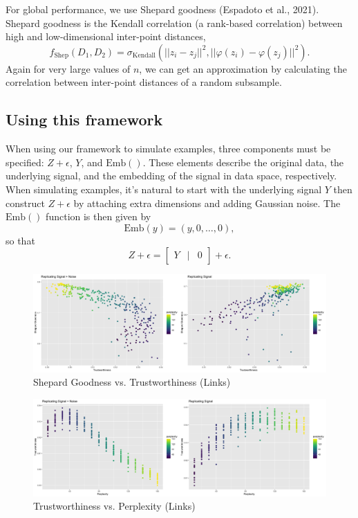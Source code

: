 \documentclass[webpdf,modern,large,namedate]{oup-authoring-template}
\theoremstyle{thmstyleone}%
\theoremstyle{thmstyletwo}%
\theoremstyle{thmstylethree}%
\begin{document}
For global performance, we use Shepard goodness (Espadoto et al., 2021). Shepard goodness is the Kendall correlation (a rank-based correlation) between high and low-dimensional inter-point distances, $$f_\textrm{Shep}(D_1, D_2) = \sigma_\textrm{Kendall}(||z_i - z_j||^2, ||\varphi(z_i) - \varphi(z_j)||^2).$$ Again for very large values of $n$, we can get an approximation by calculating the correlation between inter-point distances of a random subsample.

\subsection{Using this framework}
When using our framework to simulate examples, three components must be specified: $Z + \epsilon$, $Y$, and $\textrm{Emb}()$. These elements describe the original data, the underlying signal, and the embedding of the signal in data space, respectively. When simulating examples, it's natural to start with the underlying signal $Y$ then construct $Z + \epsilon$ by attaching extra dimensions and adding Gaussian noise. The $\textrm{Emb}()$ function is then given by $$\textrm{Emb}(y) = (y,0,\hdots,0),$$ so that
$$Z + \epsilon = \begin{bmatrix}
Y & \vert & 0
\end{bmatrix} + \epsilon.$$

\renewcommand{\thefigure}{3a}
\begin{figure}[b]
\centering
\includegraphics[scale=0.28]{links plot}
\caption{Shepard Goodness vs. Trustworthiness (Links)}
\end{figure}

\renewcommand{\thefigure}{3b}
\begin{figure}[t]
\centering
\includegraphics[scale=0.28]{trust plot (links)}
\caption{Trustworthiness vs. Perplexity (Links)}
\end{figure}
\end{document}
